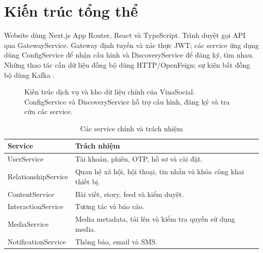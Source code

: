 \section{Kiến trúc tổng thể}
Website dùng Next.js App Router, React và TypeScript. Trình duyệt gọi API qua GatewayService. Gateway định tuyến và xác thực JWT; các service ứng dụng dùng ConfigService để nhận cấu hình và DiscoveryService để đăng ký, tìm nhau. Những thao tác cần dữ liệu đồng bộ dùng HTTP/OpenFeign; sự kiện bất đồng bộ dùng Kafka \cite{architecture}.

\begin{figure}[htbp]
\centering
{}
\caption{Kiến trúc dịch vụ và kho dữ liệu chính của VinaSocial. ConfigService và DiscoveryService hỗ trợ cấu hình, đăng ký và tra cứu các service.}
\label{fig:kien-truc}
\end{figure}

\begin{table}[ht]
\centering
\caption{Các service chính và trách nhiệm}
\begin{tabular}{p{}p{}}
\toprule
Service & Trách nhiệm \\
\midrule
UserService & Tài khoản, phiên, OTP, hồ sơ và cài đặt. \\
RelationshipService & Quan hệ xã hội, hội thoại, tin nhắn và khóa công khai thiết bị. \\
ContentService & Bài viết, story, feed và kiểm duyệt. \\
InteractionService & Tương tác và báo cáo. \\
MediaService & Media metadata, tải lên và kiểm tra quyền sử dụng media. \\
NotificationService & Thông báo, email và SMS. \\
\bottomrule
\end{tabular}
\end{table}

